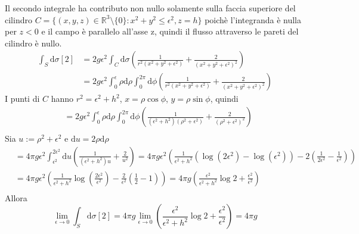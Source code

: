 Il secondo integrale ha contributo non nullo solamente sulla faccia superiore del cilindro
$C = \{ (x,y,z) \in \mathbb{R}^3 \setminus \{0\} : x^2 + y^2 \leq \epsilon^2, z = h \}$
poichè l'integranda è nulla per $z<0$ e il campo è parallelo all'asse z, quindi il flusso
attraverso le pareti del cilindro è nullo.
\begin{equation*}
   \begin{split}
       \int_S \mathrm{d}\sigma [2] &= 2g\epsilon^2 \int_C \mathrm{d}\sigma
             \left( \frac{1}{r^2(x^2 + y^2 + \epsilon^2)}
                + \frac{2}{(x^2 + y^2 + \epsilon^2)^2} \right) \\
       &= 2g\epsilon^2 \int_0^\epsilon\rho\mathrm{d}\rho \int_0^{2\pi} \mathrm{d}\phi
       \left( \frac{1}{r^2(x^2 + y^2 + \epsilon^2)}
           + \frac{2}{(x^2 + y^2 + \epsilon^2)^2}\right)
   \end{split}
\end{equation*}
I punti di $C$ hanno $r^2 = \epsilon^2 + h^2$, $x = \rho \cos\phi$, $y = \rho \sin\phi$, quindi
\begin{equation*}
   \begin{split}
      &= 2g\epsilon^2 \int_0^\epsilon\rho\mathrm{d}\rho \int_0^{2\pi} \mathrm{d}\phi
      \left( \frac{1}{(\epsilon^2 + h^2)(\rho^2 + \epsilon^2)}
          + \frac{2}{(\rho^2 + \epsilon^2)^2} \right) \\
   \end{split}
\end{equation*}
Sia $u := \rho^2 + \epsilon^2$ e $\mathrm{d}u = 2\rho \mathrm{d}\rho$
\begin{equation*}
   \begin{split}
      &= 4\pi g\epsilon^2 \int_{\epsilon^2}^{2\epsilon^2} \mathrm{d}u
         \left( \frac{1}{(\epsilon^2 + h^2)u} + \frac{2}{u^2} \right)
      = 4\pi g\epsilon^2
         \left( \frac{1}{\epsilon^2 + h^2}( \log(2\epsilon^2)-\log(\epsilon^2) )
            - 2\left( \frac{1}{2\epsilon^2} - \frac{1}{\epsilon^2} \right) \right) \\
      &= 4\pi g\epsilon^2
         \left( \frac{1}{\epsilon^2 + h^2} \log\left( \frac{2\epsilon^2}{\epsilon^2}\right)
            - \frac{2}{\epsilon^2}\left( \frac{1}{2} - 1 \right) \right)
      = 4\pi g
         \left( \frac{\epsilon^2}{\epsilon^2 + h^2} \log 2
            + \frac{\epsilon^2}{\epsilon^2} \right) \\
   \end{split}
\end{equation*}
Allora
$$
   \lim_{\epsilon \to 0} \int_S \mathrm{d}\sigma [2] = 4\pi g
      \lim_{\epsilon \to 0} \left( \frac{\epsilon^2}{\epsilon^2 + h^2} \log 2
         + \frac{\epsilon^2}{\epsilon^2} \right) = 4\pi g
$$

